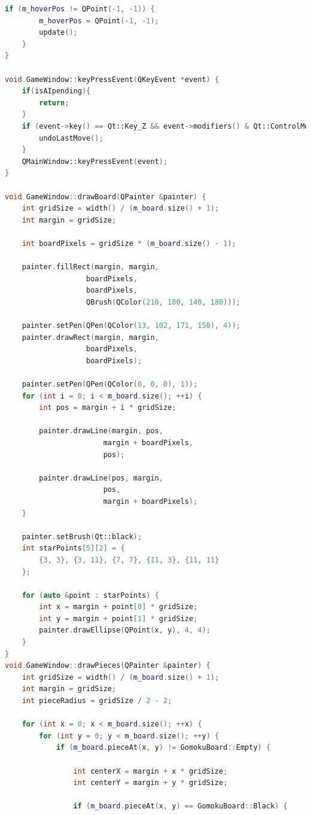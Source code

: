\documentclass[UTF8]{ctexart}
\begin{document}
\begin{lstlisting}[language=C++]
    if (m_hoverPos != QPoint(-1, -1)) {
        m_hoverPos = QPoint(-1, -1);
        update(); 
    }
}

void GameWindow::keyPressEvent(QKeyEvent *event) {
	if(isAIpending){
		return;
	}
	if (event->key() == Qt::Key_Z && event->modifiers() & Qt::ControlModifier) {
		undoLastMove();
	}
	QMainWindow::keyPressEvent(event);
}

void GameWindow::drawBoard(QPainter &painter) {
    int gridSize = width() / (m_board.size() + 1);
    int margin = gridSize;
    
    int boardPixels = gridSize * (m_board.size() - 1);
    
    painter.fillRect(margin, margin, 
                   boardPixels, 
                   boardPixels, 
                   QBrush(QColor(210, 180, 140, 180))); 

    painter.setPen(QPen(QColor(13, 102, 171, 150), 4));
    painter.drawRect(margin, margin, 
                   boardPixels, 
                   boardPixels);

    painter.setPen(QPen(QColor(0, 0, 0), 1));
    for (int i = 0; i < m_board.size(); ++i) {
        int pos = margin + i * gridSize;

        painter.drawLine(margin, pos, 
                       margin + boardPixels, 
                       pos);

        painter.drawLine(pos, margin, 
                       pos, 
                       margin + boardPixels);
    }

    painter.setBrush(Qt::black);
    int starPoints[5][2] = {
        {3, 3}, {3, 11}, {7, 7}, {11, 3}, {11, 11} 
    };
    
    for (auto &point : starPoints) {
        int x = margin + point[0] * gridSize;
        int y = margin + point[1] * gridSize;
        painter.drawEllipse(QPoint(x, y), 4, 4); 
    }
}
void GameWindow::drawPieces(QPainter &painter) {
    int gridSize = width() / (m_board.size() + 1);
    int margin = gridSize;
    int pieceRadius = gridSize / 2 - 2;

    for (int x = 0; x < m_board.size(); ++x) {
        for (int y = 0; y < m_board.size(); ++y) {
            if (m_board.pieceAt(x, y) != GomokuBoard::Empty) {

                int centerX = margin + x * gridSize;
                int centerY = margin + y * gridSize;
                
                if (m_board.pieceAt(x, y) == GomokuBoard::Black) {


\end{lstlisting}
\end{document}
